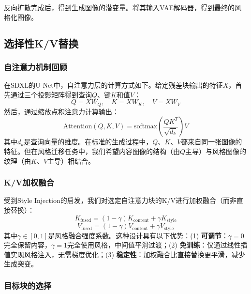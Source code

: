 \documentclass[twocolumn,a4paper,11pt]{ctexart}
\begin{document}
\medskip
{} 反向扩散完成后，得到生成图像的潜变量。将其输入VAE解码器，得到最终的风格化图像。

\subsection{选择性K/V替换}

\subsubsection{自注意力机制回顾}

在SDXL的U-Net中，自注意力层的计算方式如下。给定残差块输出的特征$X$，首先通过三个投影矩阵得到查询$Q$、键$K$和值$V$：
\begin{equation}
Q = X W_Q, \quad K = X W_K, \quad V = X W_V \label{eq:qkv}
\end{equation}
然后，通过缩放点积注意力计算输出：
\begin{equation}
\text{Attention}(Q, K, V) = \text{softmax}\!\left(\frac{QK^T}{\sqrt{d_k}}\right)V \label{eq:attention}
\end{equation}
其中$d_k$是查询向量的维度。在标准的生成过程中，$Q$、$K$、$V$都来自同一张图像的特征。但在风格迁移任务中，我们希望内容图像的结构（由$Q$主导）与风格图像的纹理（由$K$、$V$主导）相结合。

\subsubsection{K/V加权融合}

受到Style Injection的启发，我们对选定自注意力块的K/V进行加权融合（而非直接替换）：
\begin{equation}
K_{\text{fused}} = (1 - \gamma) K_{\text{content}} + \gamma K_{\text{style}} \label{eq:kfusion}
\end{equation}
\begin{equation}
V_{\text{fused}} = (1 - \gamma) V_{\text{content}} + \gamma V_{\text{style}} \label{eq:vfusion}
\end{equation}
其中$\gamma \in [0, 1]$是风格融合强度系数。这种设计具有以下优势：(1) {\bfseries 可调节}：$\gamma=0$完全保留内容，$\gamma=1$完全使用风格，中间值平滑过渡；(2) {\bfseries 免训练}：仅通过线性插值实现风格注入，无需梯度优化；(3) {\bfseries 稳定性}：加权融合比直接替换更平滑，减少生成突变。

\subsubsection{目标块的选择}
\end{document}
